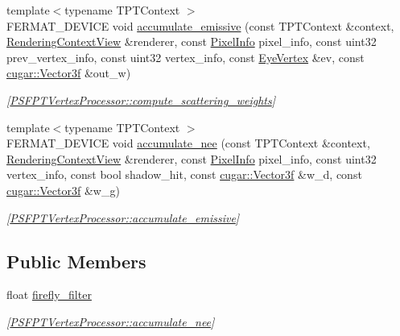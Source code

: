\begin{DoxyCompactItemize}
{\footnotesize template$<$typename T\+P\+T\+Context $>$ }\\F\+E\+R\+M\+A\+T\+\_\+\+D\+E\+V\+I\+CE void \hyperlink{struct_p_s_f_p_t_vertex_processor_adda9f64bfaa107052fd35576c5479bf3}{accumulate\+\_\+emissive} (const T\+P\+T\+Context \&context, \hyperlink{struct_rendering_context_view}{Rendering\+Context\+View} \&renderer, const \hyperlink{union_pixel_info}{Pixel\+Info} pixel\+\_\+info, const uint32 prev\+\_\+vertex\+\_\+info, const uint32 vertex\+\_\+info, const \hyperlink{struct_eye_vertex}{Eye\+Vertex} \&ev, const \hyperlink{structcugar_1_1_vector}{cugar\+::\+Vector3f} \&out\+\_\+w)
\begin{DoxyCompactList}\small\item\em \mbox{[}\hyperlink{struct_p_s_f_p_t_vertex_processor_afa5301047bd57d917658b4b8eb2bd075}{P\+S\+F\+P\+T\+Vertex\+Processor\+::compute\+\_\+scattering\+\_\+weights}\mbox{]} \end{DoxyCompactList}\item 
{\footnotesize template$<$typename T\+P\+T\+Context $>$ }\\F\+E\+R\+M\+A\+T\+\_\+\+D\+E\+V\+I\+CE void \hyperlink{struct_p_s_f_p_t_vertex_processor_a328a8d2fa5b328589e6f78e255d1101c}{accumulate\+\_\+nee} (const T\+P\+T\+Context \&context, \hyperlink{struct_rendering_context_view}{Rendering\+Context\+View} \&renderer, const \hyperlink{union_pixel_info}{Pixel\+Info} pixel\+\_\+info, const uint32 vertex\+\_\+info, const bool shadow\+\_\+hit, const \hyperlink{structcugar_1_1_vector}{cugar\+::\+Vector3f} \&w\+\_\+d, const \hyperlink{structcugar_1_1_vector}{cugar\+::\+Vector3f} \&w\+\_\+g)
\begin{DoxyCompactList}\small\item\em \mbox{[}\hyperlink{struct_p_s_f_p_t_vertex_processor_adda9f64bfaa107052fd35576c5479bf3}{P\+S\+F\+P\+T\+Vertex\+Processor\+::accumulate\+\_\+emissive}\mbox{]} \end{DoxyCompactList}\end{DoxyCompactItemize}
\subsection*{Public Members}
\begin{DoxyCompactItemize}
\item 
\mbox{\label{struct_p_s_f_p_t_vertex_processor_aa622183216d21eb2fcc7235cb0293803}} 
float \hyperlink{struct_p_s_f_p_t_vertex_processor_aa622183216d21eb2fcc7235cb0293803}{firefly\+\_\+filter}
\begin{DoxyCompactList}\small\item\em \mbox{[}\hyperlink{struct_p_s_f_p_t_vertex_processor_a328a8d2fa5b328589e6f78e255d1101c}{P\+S\+F\+P\+T\+Vertex\+Processor\+::accumulate\+\_\+nee}\mbox{]} \end{DoxyCompactList}\end{DoxyCompactItemize}
